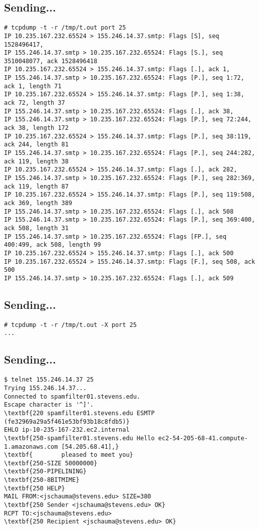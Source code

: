 \documentclass[xga]{xdvislides}
\begin{document}
\subsection{Sending...}
\smallish
\begin{verbatim}
# tcpdump -t -r /tmp/t.out port 25
IP 10.235.167.232.65524 > 155.246.14.37.smtp: Flags [S], seq 1528496417,
IP 155.246.14.37.smtp > 10.235.167.232.65524: Flags [S.], seq 3510048077, ack 1528496418
IP 10.235.167.232.65524 > 155.246.14.37.smtp: Flags [.], ack 1, 
IP 155.246.14.37.smtp > 10.235.167.232.65524: Flags [P.], seq 1:72, ack 1, length 71
IP 10.235.167.232.65524 > 155.246.14.37.smtp: Flags [P.], seq 1:38, ack 72, length 37
IP 155.246.14.37.smtp > 10.235.167.232.65524: Flags [.], ack 38, 
IP 155.246.14.37.smtp > 10.235.167.232.65524: Flags [P.], seq 72:244, ack 38, length 172
IP 10.235.167.232.65524 > 155.246.14.37.smtp: Flags [P.], seq 38:119, ack 244, length 81
IP 155.246.14.37.smtp > 10.235.167.232.65524: Flags [P.], seq 244:282, ack 119, length 38
IP 10.235.167.232.65524 > 155.246.14.37.smtp: Flags [.], ack 282,
IP 155.246.14.37.smtp > 10.235.167.232.65524: Flags [P.], seq 282:369, ack 119, length 87
IP 10.235.167.232.65524 > 155.246.14.37.smtp: Flags [P.], seq 119:508, ack 369, length 389
IP 155.246.14.37.smtp > 10.235.167.232.65524: Flags [.], ack 508
IP 155.246.14.37.smtp > 10.235.167.232.65524: Flags [P.], seq 369:400, ack 508, length 31
IP 155.246.14.37.smtp > 10.235.167.232.65524: Flags [FP.], seq 400:499, ack 508, length 99
IP 10.235.167.232.65524 > 155.246.14.37.smtp: Flags [.], ack 500
IP 10.235.167.232.65524 > 155.246.14.37.smtp: Flags [F.], seq 508, ack 500
IP 155.246.14.37.smtp > 10.235.167.232.65524: Flags [.], ack 509
\end{verbatim}
\Normalsize

\subsection{Sending...}
\begin{verbatim}
# tcpdump -t -r /tmp/t.out -X port 25
...
\end{verbatim}

\subsection{Sending...}
\begin{Verbatim}
$ telnet 155.246.14.37 25
Trying 155.246.14.37...
Connected to spamfilter01.stevens.edu.
Escape character is '^]'.
\textbf{220 spamfilter01.stevens.edu ESMTP (fe32969a29a5f461e53bf93b18c8fdb5)}
EHLO ip-10-235-167-232.ec2.internal
\textbf{250-spamfilter01.stevens.edu Hello ec2-54-205-68-41.compute-1.amazonaws.com [54.205.68.41],}
\textbf{        pleased to meet you}
\textbf{250-SIZE 50000000}
\textbf{250-PIPELINING}
\textbf{250-8BITMIME}
\textbf{250 HELP}
MAIL FROM:<jschauma@stevens.edu> SIZE=380
\textbf{250 Sender <jschauma@stevens.edu> OK}
RCPT TO:<jschauma@stevens.edu>
\textbf{250 Recipient <jschauma@stevens.edu> OK}
\end{Verbatim}
\end{document}
